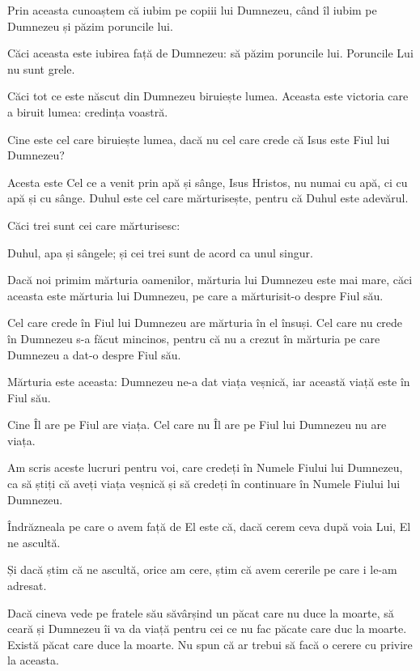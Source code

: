 {Prin aceasta cunoaștem că iubim pe copiii lui Dumnezeu, când îl iubim pe Dumnezeu și păzim poruncile lui.

Căci aceasta este iubirea față de Dumnezeu: să păzim poruncile lui. Poruncile Lui nu sunt grele.

Căci tot ce este născut din Dumnezeu biruiește lumea. Aceasta este victoria care a biruit lumea: credința voastră.

Cine este cel care biruiește lumea, dacă nu cel care crede că Isus este Fiul lui Dumnezeu?


\par }{\PP {}Acesta este Cel ce a venit prin apă și sânge, Isus Hristos, nu numai cu apă, ci cu apă și cu sânge. Duhul este cel care mărturisește, pentru că Duhul este adevărul.

Căci trei sunt cei care mărturisesc:

Duhul, apa și sângele; și cei trei sunt de acord ca unul singur.

Dacă noi primim mărturia oamenilor, mărturia lui Dumnezeu este mai mare, căci aceasta este mărturia lui Dumnezeu, pe care a mărturisit-o despre Fiul său.

Cel care crede în Fiul lui Dumnezeu are mărturia în el însuși. Cel care nu crede în Dumnezeu s-a făcut mincinos, pentru că nu a crezut în mărturia pe care Dumnezeu a dat-o despre Fiul său.

Mărturia este aceasta: Dumnezeu ne-a dat viața veșnică, iar această viață este în Fiul său.

Cine Îl are pe Fiul are viața. Cel care nu Îl are pe Fiul lui Dumnezeu nu are viața.


\par }{\PP {}Am scris aceste lucruri pentru voi, care credeți în Numele Fiului lui Dumnezeu, ca să știți că aveți viața veșnică și să credeți în continuare în Numele Fiului lui Dumnezeu.


\par }{\PP {}Îndrăzneala pe care o avem față de El este că, dacă cerem ceva după voia Lui, El ne ascultă.

Și dacă știm că ne ascultă, orice am cere, știm că avem cererile pe care i le-am adresat.


\par }{\PP {}Dacă cineva vede pe fratele său săvârșind un păcat care nu duce la moarte, să ceară și Dumnezeu îi va da viață pentru cei ce nu fac păcate care duc la moarte. Există păcat care duce la moarte. Nu spun că ar trebui să facă o cerere cu privire la aceasta.

}
